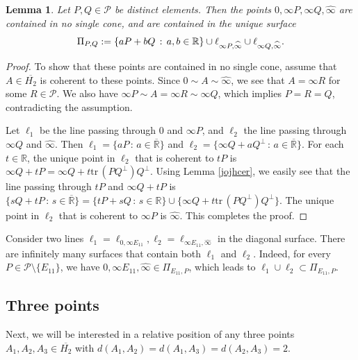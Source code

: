 \documentclass[10pt]{amsart}
\newtheorem{lemma}[theorem]{Lemma}
\theoremstyle{definition}
\theoremstyle{remark}
\numberwithin{subsection}{section}
\numberwithin{equation}{section}
\newcommand\cP{{\mathcal{P}}}
\newcommand\bR{{\mathbb{R}}}
\newcommand\oH{{\overline{H_2}}}
\newcommand\oi{{\widehat{\infty}}}
\newcommand\oR{{\overline{\mathbb{R}}}}
\begin{document}
\begin{lemma}\label{inftysurface}
Let $P, Q\in \cP$ be distinct elements. 
Then the points $0, \infty P, \infty Q, \oi$ are contained in no single cone, and are contained in the unique surface 
\begin{equation}\label{PI}
\Pi_{P, Q}:=\{aP+bQ\,:\, a, b\in \bR\}\cup \ell_{\infty P, \oi}\cup \ell_{\infty Q, \oi}.\index{$PiPQ$@$\Pi_{P, Q}$}
\end{equation}
\end{lemma}
\begin{proof}
To show that these points are contained in no single cone, assume that $A\in \oH$ is coherent to these points. Since $0\sim A\sim \oi$, we see that $A=\infty R$ for some $R\in \cP$. 
We also have $\infty P\sim A=\infty R\sim \infty Q$, which implies $P=R=Q$, contradicting the assumption. 

Let $\ell_1$ be the line passing through $0$ and $\infty P$, and $\ell_2$ the line passing through $\infty Q$ and $\oi$. Then $\ell_1=\{aP\,:\, a\in {\oR}\}$ and $\ell_2=\{\infty Q+ aQ^\perp\,:\, a\in {\oR}\}$. 
For each $t\in\mathbb{R}$, the unique point in $\ell_2$ that is coherent to $tP$ is $\infty Q+tP=\infty Q+t\mathrm{tr}\,(PQ^\perp)Q^\perp$. Using Lemma \ref{jojhcer}, we easily see that
the line passing through $tP$ and $\infty Q+tP$ is $\{sQ+tP\,:\, s\in \oR\} =\{tP+sQ\,:\, s\in \mathbb{R}\}\cup \{\infty Q+t\mathrm{tr}\,(PQ^\perp)Q^\perp\}$. 
The unique point in $\ell_2$ that is coherent to $\infty P$ is $\oi$. 
This completes the proof.
\end{proof}

Consider two lines $\ell_1=\ell_{0, \infty E_{11}}, \ell_2=\ell_{\infty E_{11}, \oi}$ in the diagonal surface. 
There are infinitely many surfaces that contain both $\ell_1$ and $\ell_2$. 
Indeed, for every $P\in \mathcal{P}\setminus\{E_{11}\}$, we have $0, \infty E_{11}, \oi\in \Pi_{E_{11}, P}$, which leads to $\ell_1\cup \ell_2\subset \Pi_{E_{11}, P}$.


\subsection{Three points}\label{three points}
Next, we will be interested in a relative position of any three points $A_1 , A_2 , A_3 \in \oH$ with $d(A_1 , A_2 ) = d(A_1 , A_3 ) = d(A_2 , A_3 ) = 2$.
\end{document}
